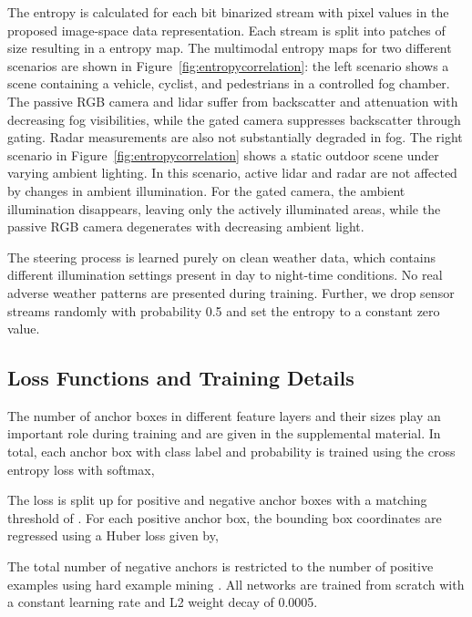 The entropy is calculated for each \unit[8]{bit} binarized stream  with pixel values  in the proposed image-space data representation. Each stream is split into patches of size  resulting in a  entropy map. The multimodal entropy maps for two different scenarios are shown in Figure~\ref{fig:entropycorrelation}: the left scenario shows a scene containing a vehicle, cyclist, and pedestrians in a controlled fog chamber. The passive RGB camera and lidar suffer from backscatter and attenuation with decreasing fog visibilities, while the gated camera suppresses backscatter through gating. Radar measurements are also not substantially degraded in fog. The right scenario in Figure~\ref{fig:entropycorrelation} shows a static outdoor scene under varying ambient lighting. In this scenario, active lidar and radar are not affected by changes in ambient illumination. For the gated camera, the ambient illumination disappears, leaving only the actively illuminated areas, while the passive RGB camera degenerates with decreasing ambient light. 

The steering process is learned purely on clean weather data, which contains different illumination settings present in day to night-time conditions. No real adverse weather patterns are presented during training. Further, we drop sensor streams randomly with probability 0.5 and set the entropy to a constant zero value. 

\subsection{Loss Functions and Training Details}\label{sec:training}
The number of anchor boxes in different feature layers and their sizes play an important role during training and are given in the supplemental material. In total, each anchor box with class label  and probability  is trained using the cross entropy loss with softmax, 
\vspace{-5pt}

The loss is split up for positive and negative anchor boxes with a matching threshold of . For each positive anchor box, the bounding box coordinates  are regressed using a Huber loss  given by,
\vspace{-10pt}

The total number of negative anchors is restricted to  the number of positive examples using hard example mining \cite{SSDLiu2015,Shrivastava16}. All networks are trained from scratch with a constant learning rate and L2 weight decay of 0.0005. 